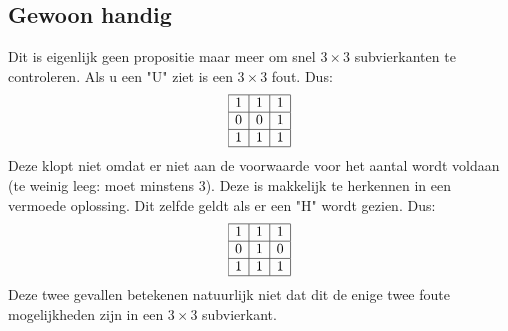 \documentclass[11pt]{article}
\begin{document}
\subsection{Gewoon handig}
Dit is eigenlijk geen propositie maar meer om snel $3 \times 3$ subvierkanten te controleren. Als u een "U" ziet is een $3 \times 3$ fout. Dus:
\[
\begin{array}{|r|r|r|}
\hline
1 & 1 & 1 \\
\hline
0 & 0 & 1 \\
\hline
1 & 1 & 1 \\
\hline
\end{array}
\]
Deze klopt niet omdat er niet aan de voorwaarde voor het aantal wordt voldaan (te weinig leeg: moet minstens 3). Deze is makkelijk te herkennen in een vermoede oplossing. Dit zelfde geldt als er een "H" wordt gezien. Dus:
\[
\begin{array}{|r|r|r|}
\hline
1 & 1 & 1 \\
\hline
0 & 1 & 0 \\
\hline
1 & 1 & 1 \\
\hline
\end{array}
\]
Deze twee gevallen betekenen natuurlijk niet dat dit de enige twee foute mogelijkheden zijn in een $3 \times 3$ subvierkant.
\end{document}
